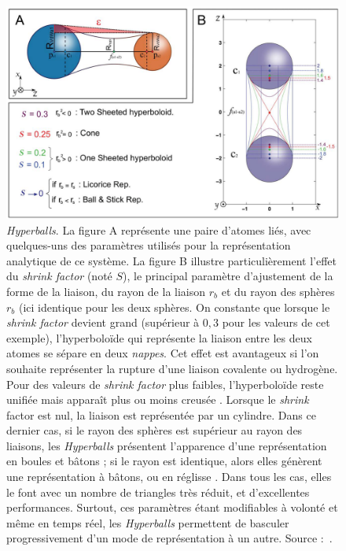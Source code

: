 	\begin{figure}[H]
    	\centering
    	\includegraphics[width=\textwidth]{figures/ch1/hyperballs}
    	\caption{\emph{Hyperballs}. La figure A représente une paire d'atomes liés, avec quelques-uns des paramètres utilisés pour la représentation analytique de ce système. La figure B illustre particulièrement l'effet du \emph{shrink factor} (noté $S$), le principal paramètre d'ajustement de la forme de la liaison, du rayon de la liaison $r_{b}$ et du rayon des sphères $r_{b}$ (ici identique pour les deux sphères. On constante que lorsque le \emph{shrink factor} devient grand (supérieur à $0,3$ pour les valeurs de cet exemple), l'hyperboloïde qui représente la liaison entre les deux atomes se sépare en deux \emph{nappes}. Cet effet est avantageux si l'on souhaite représenter la rupture d'une liaison covalente ou hydrogène. Pour des valeurs de \emph{shrink factor} plus faibles, l'hyperboloïde reste unifiée mais apparaît plus ou moins \og creusée \fg{}. Lorsque le \emph{shrink} factor est nul, la liaison est représentée par un cylindre. Dans ce dernier cas, si le rayon des sphères est supérieur au rayon des liaisons, les \emph{Hyperballs} présentent l'apparence d'une représentation en boules et bâtons ; si le rayon est identique, alors elles génèrent une représentation à bâtons, ou \og en réglisse \fg{}. Dans tous les cas, elles le font avec un nombre de triangles très réduit, et d'excellentes performances. Surtout, ces paramètres étant modifiables à volonté et même en temps réel, les \emph{Hyperballs} permettent de basculer progressivement d'un mode de représentation à un autre. Source :~\cite{chavent2011gpu}.}
   		\label{fig:hyperballs}
    \end{figure}
		
